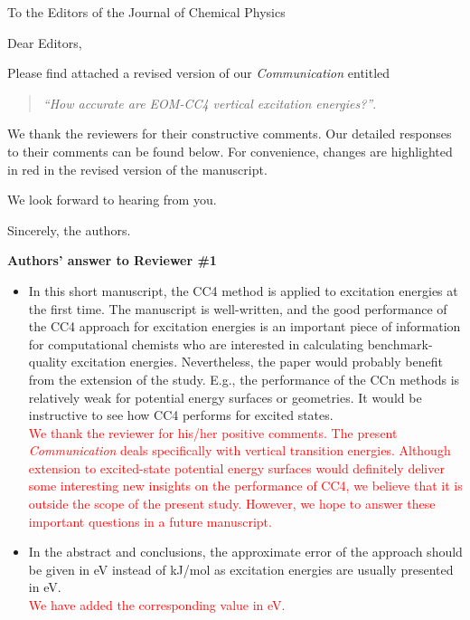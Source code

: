\documentclass[10pt]{letter}
\newcommand{\alert}[1]{\textcolor{red}{#1}}
\begin{document}
\begin{letter}%
{To the Editors of the Journal of Chemical Physics}

\opening{Dear Editors,}

\justifying
Please find attached a revised version of our \textit{Communication} entitled 
\begin{quote}
\textit{``How accurate are EOM-CC4 vertical excitation energies?''}.
\end{quote}
We thank the reviewers for their constructive comments.
Our detailed responses to their comments can be found below.
For convenience, changes are highlighted in red in the revised version of the manuscript. 

We look forward to hearing from you.

\closing{Sincerely, the authors.}

\noindent \textbf{\large Authors' answer to Reviewer \#1}

\begin{itemize}

	\item 
	{In this short manuscript, the CC4 method is applied to excitation energies at the first time. 
	The manuscript is well-written, and the good performance of the CC4 approach for excitation energies is an important piece of information for computational chemists who are interested in calculating benchmark-quality excitation energies. 
	Nevertheless, the paper would probably benefit from the extension of the study. 
	E.g., the performance of the CCn methods is relatively weak for potential energy surfaces or geometries. 
	It would be instructive to see how CC4 performs for excited states.}
	\\
	\alert{We thank the reviewer for his/her positive comments.
	The present \textit{Communication} deals specifically with vertical transition energies.
	Although extension to excited-state potential energy surfaces would definitely deliver some interesting new insights on the performance of CC4, we believe that it is outside the scope of the present study.
	However, we hope to answer these important questions in a future manuscript.}

	\item 
	{In the abstract and conclusions, the approximate error of the approach should be given in eV instead of kJ/mol as excitation energies are usually presented in eV.}
	\\
	\alert{We have added the corresponding value in eV.}
		

\end{itemize}
\end{letter}
\end{document}
